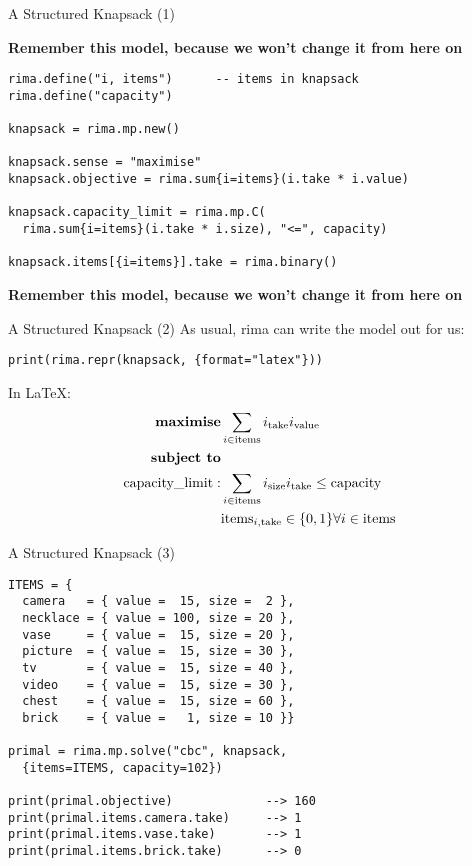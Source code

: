 \documentclass[smaller]{beamer}
\begin{document}
\begin{frame}[fragile]{A Structured Knapsack (1)}
\begin{overprint}
  \bf{Remember this model, because we won't change it from here on}

  \begin{lstlisting}
rima.define("i, items")      -- items in knapsack
rima.define("capacity")

knapsack = rima.mp.new()
 
knapsack.sense = "maximise"
knapsack.objective = rima.sum{i=items}(i.take * i.value)

knapsack.capacity_limit = rima.mp.C(
  rima.sum{i=items}(i.take * i.size), "<=", capacity)

knapsack.items[{i=items}].take = rima.binary()
  \end{lstlisting}

  \bf{Remember this model, because we won't change it from here on}
  \end{overprint}
\end{frame}


\begin{frame}[fragile]{A Structured Knapsack (2)}
  As usual, rima can write the model out for us:
  \begin{lstlisting}
print(rima.repr(knapsack, {format="latex"}))
  \end{lstlisting}

  In \LaTeX:
\begin{align*}
\text{\bf maximise} & \sum_{i \in \text{items}} i_{\text{take}} i_{\text{value}} \\
\text{\bf subject to} \\
\text{capacity\_limit}: & \sum_{i \in \text{items}} i_{\text{size}} i_{\text{take}} \leq \text{capacity} \\
& \text{items}_{i,\text{take}} \in \{0, 1\} \forall i \in \text{items}\\
\end{align*}

\end{frame}



\begin{frame}[fragile]{A Structured Knapsack (3)}
  \begin{lstlisting}
ITEMS = {
  camera   = { value =  15, size =  2 },
  necklace = { value = 100, size = 20 },
  vase     = { value =  15, size = 20 },
  picture  = { value =  15, size = 30 },
  tv       = { value =  15, size = 40 },
  video    = { value =  15, size = 30 },
  chest    = { value =  15, size = 60 },
  brick    = { value =   1, size = 10 }}

primal = rima.mp.solve("cbc", knapsack,
  {items=ITEMS, capacity=102})

print(primal.objective)             --> 160
print(primal.items.camera.take)     --> 1
print(primal.items.vase.take)       --> 1
print(primal.items.brick.take)      --> 0
  \end{lstlisting}
\end{frame}
\end{document}
